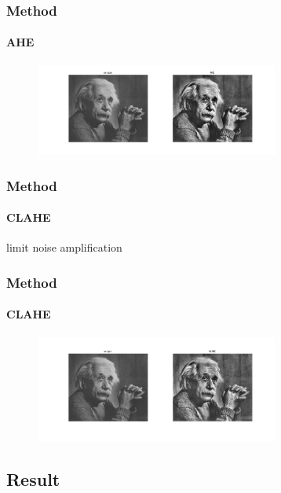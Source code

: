 \documentclass[11 pt,t]{beamer}
\begin{document}
\begin{frame}
\frametitle{Method}
\framesubtitle{AHE}
\begin{minipage}[t]{\linewidth}\centering
\begin{figure}
   \includegraphics[width=8cm]{AHEeinstein.png}
\end{figure}
\end{minipage}
\end{frame}

\begin{frame}
\frametitle{Method}
\framesubtitle{CLAHE}
\vspace{20pt}
\begin{center}
limit noise amplification
\end{center}
\end{frame}


\begin{frame}
\frametitle{Method}
\framesubtitle{CLAHE}
\begin{minipage}[t]{\linewidth}\centering
\begin{figure}
   \includegraphics[width=8cm]{CLAHEeinstein.png}
\end{figure}
\end{minipage}
\end{frame}

\subsection{Result}
\end{document}
